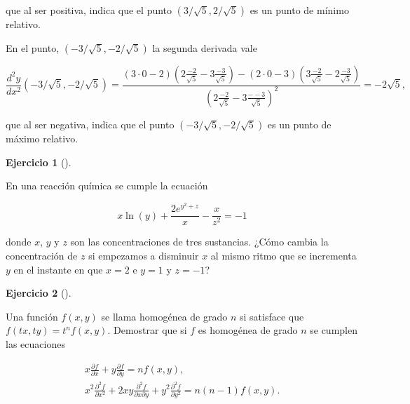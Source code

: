 \documentclass[
  a4paper,
]{scrreport}
\theoremstyle{definition}
\newtheorem{exercise}{Ejercicio}[chapter]
\theoremstyle{remark}
\begin{document}
\begin{tcolorbox}
que al ser positiva, indica que el punto \((3/\sqrt{5},2/\sqrt{5})\) es
un punto de mínimo relativo.

En el punto, \((-3/\sqrt{5},-2/\sqrt{5})\) la segunda derivada vale

\[
\frac{d^{2}y}{dx^{2}}(-3/\sqrt{5},-2/\sqrt{5})=
\frac{(3\cdot 0-2)(2\frac{-2}{\sqrt{5}}-3\frac{-3}{\sqrt{5}})-(2\cdot 0-3)(3\frac{-2}{\sqrt{5}}-2\frac{-3}{\sqrt{5}})}{(2\frac{-2}{\sqrt{5}}-3\frac{--3}{\sqrt{5}})^{2}} = -2\sqrt{5},
\]

que al ser negativa, indica que el punto \((-3/\sqrt{5},-2/\sqrt{5})\)
es un punto de máximo relativo.

\end{tcolorbox}

\begin{exercise}[]\protect\hypertarget{exr-derivada-implicita-direccional}{}\label{exr-derivada-implicita-direccional}

En una reacción química se cumple la ecuación

\[
x\ln(y)+\frac{2e^{y^2+z}}{x} - \frac{x}{z^2} = -1
\]

donde \(x\), \(y\) y \(z\) son las concentraciones de tres sustancias.
¿Cómo cambia la concentración de \(z\) si empezamos a disminuir \(x\) al
mismo ritmo que se incrementa \(y\) en el instante en que \(x=2\) e
\(y=1\) y \(z=-1\)?

\end{exercise}

\begin{exercise}[]\protect\hypertarget{exr-funcion-homogenea}{}\label{exr-funcion-homogenea}

Una función \(f(x,y)\) se llama homogénea de grado \(n\) si satisface
que \(f(tx, ty) = t^nf(x,y)\). Demostrar que si \(f\) es homogénea de
grado \(n\) se cumplen las ecuaciones

\[
\begin{gathered}
x\frac{\partial f}{\partial x} + y \frac{\partial f}{\partial y} = nf(x,y),\\
x^2\frac{\partial^2 f}{\partial x^2} + 2xy \frac{\partial^2 f}{\partial x \partial y} + y^2 \frac{\partial^2 f}{\partial y^2} = n(n-1)f(x,y).
\end{gathered}
\]

\end{exercise}
\end{document}
